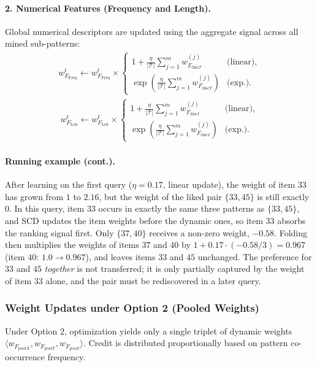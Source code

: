\documentclass[sigconf]{acmart}
\newcommand{\disc}{\mathrm{disc}}
\newcommand{\pool}{\mathrm{pool}}
\newcommand{\Freq}{\mathrm{Freq}}
\newcommand{\Len}{\mathrm{Len}}
\begin{document}
\paragraph{2. Numerical Features (Frequency and Length).}
Global numerical descriptors are updated using the aggregate signal across all mined sub-patterns:
\begin{equation}\label{eq:fine-freq}
\begin{split}
 w_{F_{\Freq}}^t\leftarrow w_{F_{\Freq}}^t\times\begin{cases}
 1+\frac{\eta}{|\mathcal T|}\sum_{j=1}^{m}w_{F_{\disc T}}^{(j)} &\text{(linear)},\\
 \exp\!\left(\frac{\eta}{|\mathcal T|}\sum_{j=1}^{m}w_{F_{\disc T}}^{(j)}\right) &\text{(exp.)}.
 \end{cases}
\end{split}
\end{equation}
\begin{equation}\label{eq:fine-length}
\begin{split}
 w_{F_{\Len}}^t\leftarrow w_{F_{\Len}}^t\times\begin{cases}
 1+\frac{\eta}{|\mathcal T|}\sum_{j=1}^{m}w_{F_{\disc I}}^{(j)} &\text{(linear)},\\
 \exp\!\left(\frac{\eta}{|\mathcal T|}\sum_{j=1}^{m}w_{F_{\disc I}}^{(j)}\right) &\text{(exp.)}.
 \end{cases}
\end{split}
\end{equation}

\paragraph{Running example (cont.).}
After learning on the first query ($\eta=0.17$, linear update), the weight of item $33$ has grown from $1$ to $2.16$, but the weight of the liked pair $\{33,45\}$ is still exactly $0$. In this query, item $33$ occurs in exactly the same three patterns as $\{33,45\}$, and SCD updates the item weights before the dynamic ones, so item $33$ absorbs the ranking signal first. Only $\{37,40\}$ receives a non-zero weight, $-0.58$. Folding then multiplies the weights of items $37$ and $40$ by $1+0.17\cdot(-0.58/3)=0.967$ (item $40$: $1.0\to0.967$), and leaves items $33$ and $45$ unchanged. The preference for $33$ and $45$ \emph{together} is not transferred; it is only partially captured by the weight of item $33$ alone, and the pair must be rediscovered in a later query.

\subsubsection{Weight Updates under Option 2 (Pooled Weights)}
Under Option 2, optimization yields only a single triplet of dynamic weights $\langle w_{F_{\pool X}},w_{F_{\pool T}},w_{F_{\pool I}}\rangle$. Credit is distributed proportionally based on pattern co-occurrence frequency.
\end{document}
